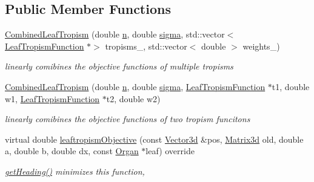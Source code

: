 \subsection*{Public Member Functions}
\begin{DoxyCompactItemize}
\item 
\mbox{\label{classCPlantBox_1_1CombinedLeafTropism_a864af63cb3897d5d7793f23df84f9049}} 
\hyperlink{classCPlantBox_1_1CombinedLeafTropism_a864af63cb3897d5d7793f23df84f9049}{Combined\+Leaf\+Tropism} (double \hyperlink{classCPlantBox_1_1LeafTropismFunction_a21d8d756f8b9f6015b546def33b01c89}{n}, double \hyperlink{classCPlantBox_1_1LeafTropismFunction_a82a3dc11056a65501bc4535749c304b6}{sigma}, std\+::vector$<$ \hyperlink{classCPlantBox_1_1LeafTropismFunction}{Leaf\+Tropism\+Function} $\ast$$>$ tropisms\+\_\+, std\+::vector$<$ double $>$ weights\+\_\+)
\begin{DoxyCompactList}\small\item\em linearly comibines the objective functions of multiple tropisms \end{DoxyCompactList}\item 
\hyperlink{classCPlantBox_1_1CombinedLeafTropism_a932f5340663a5785b31f4013fe0132aa}{Combined\+Leaf\+Tropism} (double \hyperlink{classCPlantBox_1_1LeafTropismFunction_a21d8d756f8b9f6015b546def33b01c89}{n}, double \hyperlink{classCPlantBox_1_1LeafTropismFunction_a82a3dc11056a65501bc4535749c304b6}{sigma}, \hyperlink{classCPlantBox_1_1LeafTropismFunction}{Leaf\+Tropism\+Function} $\ast$t1, double w1, \hyperlink{classCPlantBox_1_1LeafTropismFunction}{Leaf\+Tropism\+Function} $\ast$t2, double w2)
\begin{DoxyCompactList}\small\item\em linearly comibines the objective functions of two tropism funcitons \end{DoxyCompactList}\item 
virtual double \hyperlink{classCPlantBox_1_1CombinedLeafTropism_aec7a53f31265f6c10a8666d0d8647aa5}{leaftropism\+Objective} (const \hyperlink{classCPlantBox_1_1Vector3d}{Vector3d} \&pos, \hyperlink{classCPlantBox_1_1Matrix3d}{Matrix3d} old, double a, double b, double dx, const \hyperlink{classCPlantBox_1_1Organ}{Organ} $\ast$leaf) override
\begin{DoxyCompactList}\small\item\em \hyperlink{classCPlantBox_1_1LeafTropismFunction_a1440868221a834474e34e3a503a74572}{get\+Heading()} minimizes this function, \end{DoxyCompactList}\end{DoxyCompactItemize}
